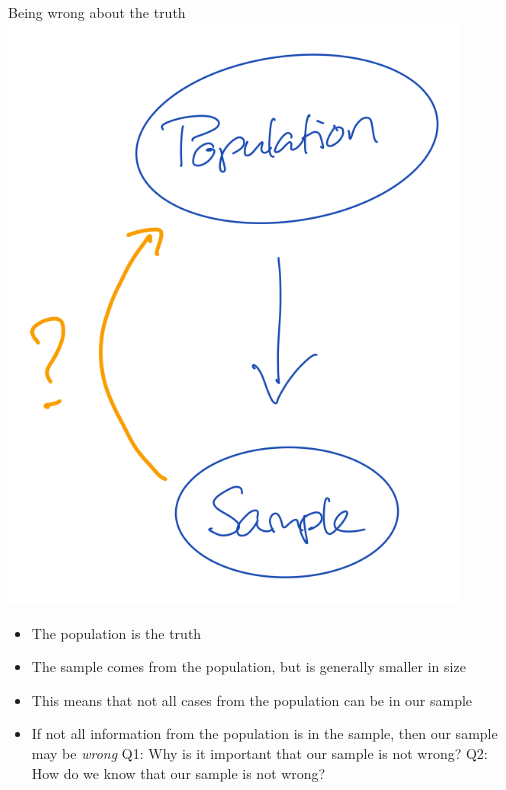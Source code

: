 \documentclass[
  ignorenonframetext,
]{beamer}
\providecommand{\tightlist}{%
  \setlength{\itemsep}{0pt}\setlength{\parskip}{0pt}}\usepackage{longtable,booktabs,array}
\begin{document}
\begin{frame}{Being wrong about the truth}
\protect\hypertarget{being-wrong-about-the-truth}{}
\includegraphics[width=0.9\textwidth,height=\textheight]{img/2. missingness_problem.png}

\begin{itemize}
\tightlist
\item
  The population is the truth
\item
  The sample comes from the population, but is generally smaller in size
\item
  This means that not all cases from the population can be in our sample
\item
  If not all information from the population is in the sample, then our
  sample may be \emph{wrong} Q1: Why is it important that our sample is
  not wrong? Q2: How do we know that our sample is not wrong?
\end{itemize}
\end{frame}
\end{document}
